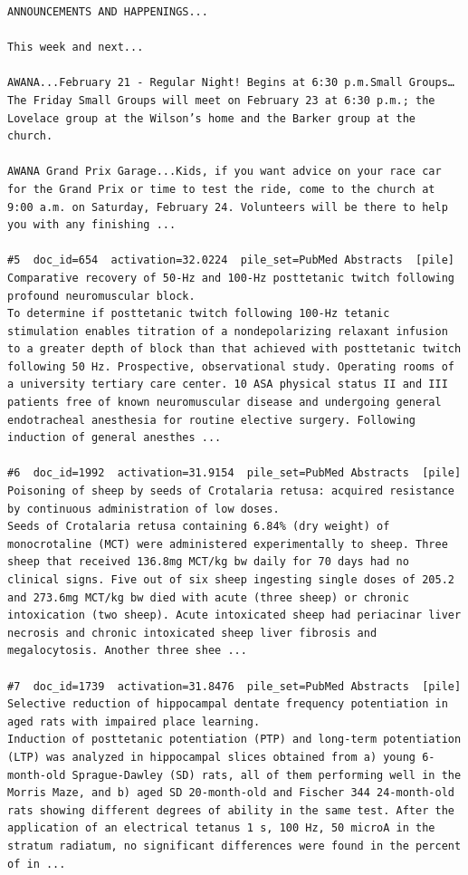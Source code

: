 \begin{verbatim}
ANNOUNCEMENTS AND HAPPENINGS...

This week and next...

AWANA...February 21 - Regular Night! Begins at 6:30 p.m.Small Groups…The Friday Small Groups will meet on February 23 at 6:30 p.m.; the Lovelace group at the Wilson’s home and the Barker group at the church.

AWANA Grand Prix Garage...Kids, if you want advice on your race car for the Grand Prix or time to test the ride, come to the church at 9:00 a.m. on Saturday, February 24. Volunteers will be there to help you with any finishing ...

#5  doc_id=654  activation=32.0224  pile_set=PubMed Abstracts  [pile]
Comparative recovery of 50-Hz and 100-Hz posttetanic twitch following profound neuromuscular block.
To determine if posttetanic twitch following 100-Hz tetanic stimulation enables titration of a nondepolarizing relaxant infusion to a greater depth of block than that achieved with posttetanic twitch following 50 Hz. Prospective, observational study. Operating rooms of a university tertiary care center. 10 ASA physical status II and III patients free of known neuromuscular disease and undergoing general endotracheal anesthesia for routine elective surgery. Following induction of general anesthes ...

#6  doc_id=1992  activation=31.9154  pile_set=PubMed Abstracts  [pile]
Poisoning of sheep by seeds of Crotalaria retusa: acquired resistance by continuous administration of low doses.
Seeds of Crotalaria retusa containing 6.84% (dry weight) of monocrotaline (MCT) were administered experimentally to sheep. Three sheep that received 136.8mg MCT/kg bw daily for 70 days had no clinical signs. Five out of six sheep ingesting single doses of 205.2 and 273.6mg MCT/kg bw died with acute (three sheep) or chronic intoxication (two sheep). Acute intoxicated sheep had periacinar liver necrosis and chronic intoxicated sheep liver fibrosis and megalocytosis. Another three shee ...

#7  doc_id=1739  activation=31.8476  pile_set=PubMed Abstracts  [pile]
Selective reduction of hippocampal dentate frequency potentiation in aged rats with impaired place learning.
Induction of posttetanic potentiation (PTP) and long-term potentiation (LTP) was analyzed in hippocampal slices obtained from a) young 6-month-old Sprague-Dawley (SD) rats, all of them performing well in the Morris Maze, and b) aged SD 20-month-old and Fischer 344 24-month-old rats showing different degrees of ability in the same test. After the application of an electrical tetanus 1 s, 100 Hz, 50 microA in the stratum radiatum, no significant differences were found in the percent of in ...


\end{verbatim}
